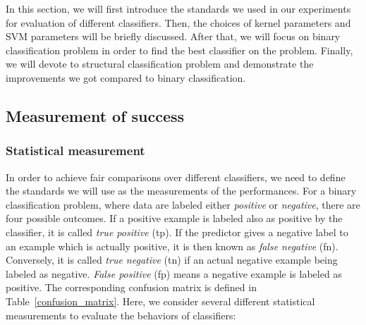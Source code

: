 \documentclass[english]{tktltiki}
\begin{document}
In this section, we will first introduce the standards we used in our experiments for evaluation of different classifiers. Then, the choices of kernel parameters and SVM parameters will be briefly discussed. After that, we will focus on binary classification problem in order to find the best classifier on the problem. Finally, we will devote to structural classification problem and demonstrate the improvements we got compared to binary classification. 

\subsection{Measurement of success}

\subsubsection{Statistical measurement}

In order to achieve fair comparisons over different classifiers, we need to define the standards we will use as the measurements of the performances. For a binary classification problem, where data are labeled either {\em positive} or {\em negative}, there are four possible outcomes. If a {positive} example is labeled also as {positive} by the classifier, it is called {\em true positive} (tp). If the predictor gives a {negative} label to an example which is actually {positive}, it is then known as {\em false negative} (fn). Conversely, it is called {\em true negative} (tn) if an actual {negative} example being labeled as {negative}. {\em False positive} (fp) means a {negative} example is labeled as {positive}. The corresponding confusion matrix is defined in Table~\ref{confusion_matrix}. Here, we consider several different statistical measurements to evaluate the behaviors of classifiers:
\end{document}
